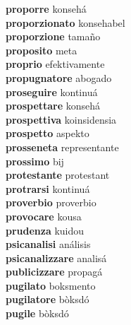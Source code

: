 \textbf{proporre } konsehá \\
\textbf{proporzionato } konsehabel \\
\textbf{proporzione } tamaño \\
\textbf{proposito } meta \\
\textbf{proprio } efektivamente \\
\textbf{propugnatore } abogado \\
\textbf{proseguire } kontinuá \\
\textbf{prospettare } konsehá \\
\textbf{prospettiva } koinsidensia \\
\textbf{prospetto } aspekto \\
\textbf{prosseneta } representante \\
\textbf{prossimo } bij \\
\textbf{protestante } protestant \\
\textbf{protrarsi } kontinuá \\
\textbf{proverbio } proverbio \\
\textbf{provocare } kousa \\
\textbf{prudenza } kuidou \\
\textbf{psicanalisi } análisis \\
\textbf{psicanalizzare } analisá \\
\textbf{publicizzare } propagá \\
\textbf{pugilato } boksmento \\
\textbf{pugilatore } bòksdó \\
\textbf{pugile } bòksdó \\
